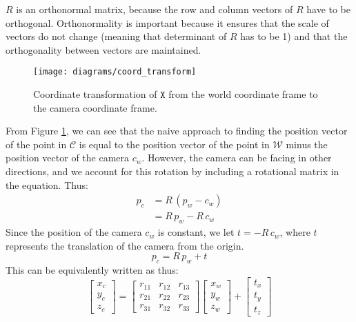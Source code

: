 $R$ is an orthonormal matrix, because the row and column vectors of $R$ have to be orthogonal. Orthonormality is important because it ensures that the scale of vectors do not change (meaning that determinant of $R$ has to be 1) and that the orthogonality between vectors are maintained.

\begin{figure}[H]
    \centering
    \texttt{[image: diagrams/coord\_transform]}
    \caption{Coordinate transformation of $\mathtt{X}$ from the world coordinate frame to the camera coordinate frame.}
    \label{fig:ext}
\end{figure}

From Figure \ref{fig:ext}, we can see that the naive approach to finding the position vector of the point in $\mathcal{C}$  is equal to the position vector of the point in $\mathcal{W}$ minus the position vector of the camera $c_w$. However, the camera can be facing in other directions, and we account for this rotation by including a rotational matrix in the equation. Thus:
\begin{align}
    p_c & = R\,(p_w-c_w) \nonumber \\
        & = R\,p_w -R\,c_w
\end{align}
Since the position of the camera $c_w$ is constant, we let $t = -R\,c_w$, where $t$ represents the translation of the camera from the origin.
\begin{equation}
    p_c = R\,p_w + t
\end{equation}
This can be equivalently written as thus:
\begin{equation*}
    \begin{bmatrix}
        x_c \\ y_c \\ z_c
    \end{bmatrix}
    =
    \begin{bmatrix}
        r_{11} & r_{12} & r_{13} \\
        r_{21} & r_{22} & r_{23} \\
        r_{31} & r_{32} & r_{33}
    \end{bmatrix}
    \begin{bmatrix}
        x_w \\ y_w \\ z_w
    \end{bmatrix}
    +
    \begin{bmatrix}
        t_x \\ t_y \\ t_z
    \end{bmatrix}
\end{equation*}
